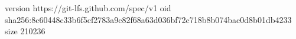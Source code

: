 version https://git-lfs.github.com/spec/v1
oid sha256:8c60448c33b6f5cf2783a9c82f68a63d036bf72c718b8b074bac0d8b01db4233
size 210236
